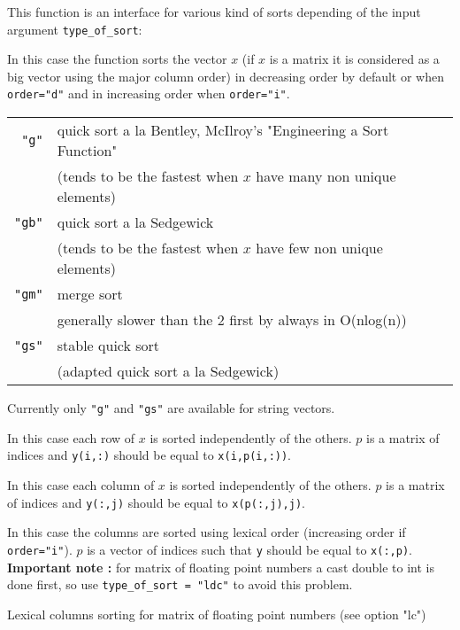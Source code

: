 \begin{mandescription}
This function is an interface for various kind of sorts depending of
the input argument \verb+type_of_sort+:

In this case the function sorts the vector $x$ (if $x$ is a matrix
it is considered as a big vector using the major column order) in 
decreasing order by default or when \verb+order="d"+ and in increasing
order when \verb+order="i"+. 

\begin{tabular}{|r|l|}
\hline
\verb+"g"+  &  quick sort a la Bentley, McIlroy's "Engineering a Sort Function" \\
            &  (tends to be the fastest when $x$ have many non unique elements) \\ 
\hline
\verb+"gb"+  &  quick sort a la Sedgewick \\
            &  (tends to be the fastest when $x$ have few non unique elements) \\ 
\hline
\verb+"gm"+  &  merge sort \\
             &  generally slower than the 2 first by always in  O(nlog(n)) \\
\hline
\verb+"gs"+  &  stable quick sort \\
             &  (adapted quick sort a la Sedgewick)  \\ 
\hline
\end{tabular}

Currently only \verb+"g"+ and  \verb+"gs"+ are available for string vectors.

In this case each row of $x$ is sorted independently of the others.
$p$ is a matrix of indices and \verb+y(i,:)+ should be equal to
\verb+x(i,p(i,:))+. 

In this case each column of $x$ is sorted independently of the others.
$p$ is a matrix of indices and \verb+y(:,j)+ should be equal to
\verb+x(p(:,j),j)+. 

In this case the columns are sorted using lexical order (increasing 
order if \verb+order="i"+). $p$ is a vector of indices such that \verb+y+ should be equal to
\verb+x(:,p)+. {\bf Important note :} for matrix of floating point numbers a cast double 
to int is done first, so use {\tt type\_of\_sort = "ldc"} to avoid this problem.

Lexical columns sorting for matrix of floating point numbers (see option "lc")  


\end{mandescription}
